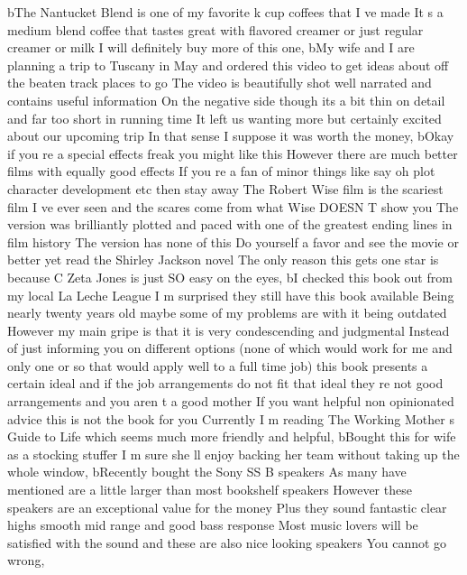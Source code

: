 \documentclass[
]{article}
\newenvironment{Shaded}{}{}
\newcommand{\NormalTok}[1]{#1}
\newcommand{\StringTok}[1]{\textcolor[rgb]{0.25,0.44,0.63}{#1}}
\begin{document}
\begin{Shaded}
\begin{Highlighting}[]
\NormalTok{       b}\StringTok{\textquotesingle{}The Nantucket Blend is one of my favorite k cup coffees that I ve made It s a medium blend coffee that tastes great with flavored creamer or just regular creamer or milk I will definitely buy more of this one\textquotesingle{}}\NormalTok{,}
\NormalTok{       b}\StringTok{\textquotesingle{}My wife and I are planning a trip to Tuscany in May and ordered this video to get ideas about off the beaten track places to go The video is beautifully shot well narrated and contains useful information On the negative side though its a bit thin on detail and far too short in running time It left us wanting more but certainly excited about our upcoming trip In that sense I suppose it was worth the money\textquotesingle{}}\NormalTok{,}
\NormalTok{       b}\StringTok{\textquotesingle{}Okay if you re a special effects freak you might like this However there are much better films with equally good effects If you re a fan of minor things like say oh plot character development etc then stay away The Robert Wise film is the scariest film I ve ever seen and the scares come from what Wise DOESN T show you The version was brilliantly plotted and paced with one of the greatest ending lines in film history The version has none of this Do yourself a favor and see the movie or better yet read the Shirley Jackson novel The only reason this gets one star is because C Zeta Jones is just SO easy on the eyes\textquotesingle{}}\NormalTok{,}
\NormalTok{       b}\StringTok{\textquotesingle{}I checked this book out from my local La Leche League I m surprised they still have this book available Being nearly twenty years old maybe some of my problems are with it being outdated However my main gripe is that it is very condescending and judgmental Instead of just informing you on different options (none of which would work for me and only one or so that would apply well to a full time job) this book presents a certain ideal and if the job arrangements do not fit that ideal they re not good arrangements and you aren t a good mother If you want helpful non opinionated advice this is not the book for you Currently I m reading The Working Mother s Guide to Life which seems much more friendly and helpful\textquotesingle{}}\NormalTok{,}
\NormalTok{       b}\StringTok{\textquotesingle{}Bought this for wife as a stocking stuffer I m sure she ll enjoy backing her team without taking up the whole window\textquotesingle{}}\NormalTok{,}
\NormalTok{       b}\StringTok{\textquotesingle{}Recently bought the Sony SS B speakers As many have mentioned are a little larger than most bookshelf speakers However these speakers are an exceptional value for the money Plus they sound fantastic clear highs smooth mid range and good bass response Most music lovers will be satisfied with the sound and these are also nice looking speakers You cannot go wrong\textquotesingle{}}\NormalTok{,}

\end{Highlighting}
\end{Shaded}
\end{document}
